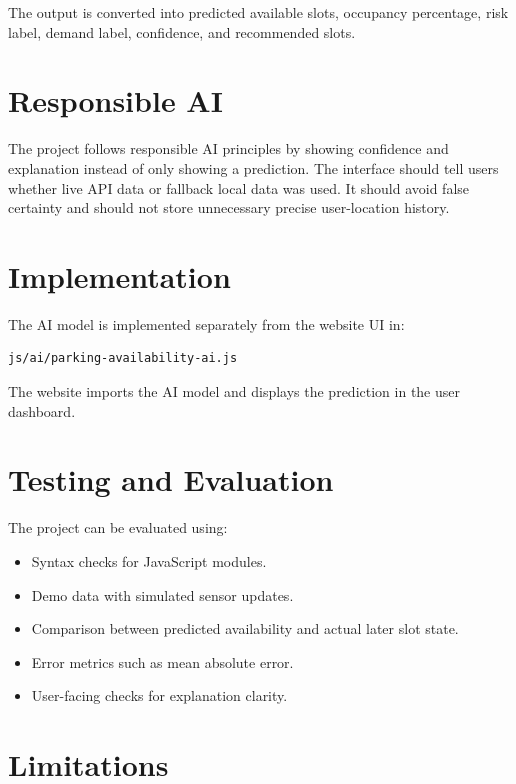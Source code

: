 \documentclass[12pt,a4paper]{article}
\begin{document}
The output is converted into predicted available slots, occupancy percentage, risk label, demand label, confidence, and recommended slots.

\section{Responsible AI}
\label{sec:responsible-ai}

The project follows responsible AI principles by showing confidence and explanation instead of only showing a prediction. The interface should tell users whether live API data or fallback local data was used. It should avoid false certainty and should not store unnecessary precise user-location history.

\section{Implementation}
\label{sec:implementation}

The AI model is implemented separately from the website UI in:

\begin{lstlisting}
js/ai/parking-availability-ai.js
\end{lstlisting}

The website imports the AI model and displays the prediction in the user dashboard.

\section{Testing and Evaluation}
\label{sec:testing}

The project can be evaluated using:

\begin{itemize}
  \item Syntax checks for JavaScript modules.
  \item Demo data with simulated sensor updates.
  \item Comparison between predicted availability and actual later slot state.
  \item Error metrics such as mean absolute error.
  \item User-facing checks for explanation clarity.
\end{itemize}

\section{Limitations}
\label{sec:limitations}
\end{document}
